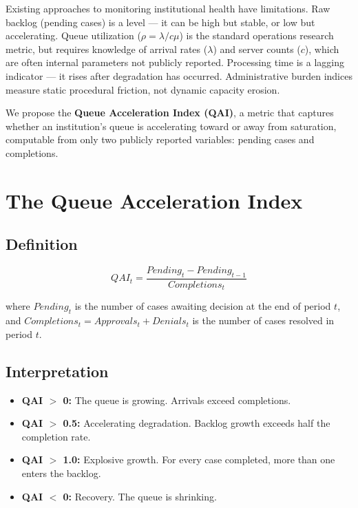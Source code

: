 \documentclass{article}
\begin{document}
Existing approaches to monitoring institutional health have limitations. Raw backlog (pending cases) is a level — it can be high but stable, or low but accelerating. Queue utilization ($\rho = \lambda/c\mu$) is the standard operations research metric, but requires knowledge of arrival rates ($\lambda$) and server counts ($c$), which are often internal parameters not publicly reported. Processing time is a lagging indicator — it rises after degradation has occurred. Administrative burden indices \cite{herd-moynihan2018} measure static procedural friction, not dynamic capacity erosion.

We propose the \textbf{Queue Acceleration Index (QAI)}, a metric that captures whether an institution's queue is accelerating toward or away from saturation, computable from only two publicly reported variables: pending cases and completions.

\section{The Queue Acceleration Index}

\subsection{Definition}

\begin{equation}
QAI_t = \frac{Pending_t - Pending_{t-1}}{Completions_t}
\end{equation}

where $Pending_t$ is the number of cases awaiting decision at the end of period $t$, and $Completions_t = Approvals_t + Denials_t$ is the number of cases resolved in period $t$.

\subsection{Interpretation}
\begin{itemize}
\item \textbf{QAI $>$ 0:} The queue is growing. Arrivals exceed completions.
\item \textbf{QAI $>$ 0.5:} Accelerating degradation. Backlog growth exceeds half the completion rate.
\item \textbf{QAI $>$ 1.0:} Explosive growth. For every case completed, more than one enters the backlog.
\item \textbf{QAI $<$ 0:} Recovery. The queue is shrinking.
\end{itemize}
\end{document}
